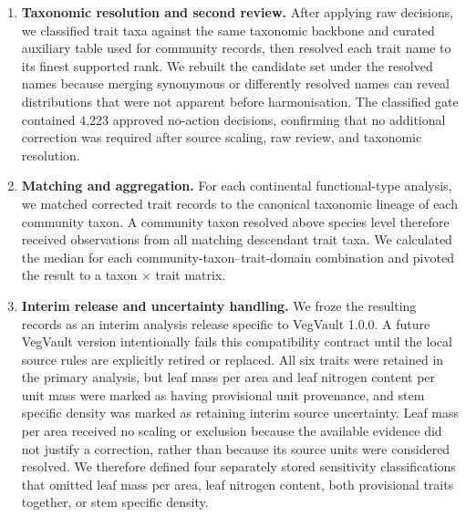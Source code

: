 \documentclass[
  12pt,
]{article}
\begin{document}
\begin{enumerate}
  gathering. AI-generated recommendations remained proposals; only
  decisions explicitly approved by the project owner with reviewer and
  date metadata entered the pipeline. The completed raw gate contained
  4,339 approved decisions: 4,262 no-action decisions, 20 exclusions,
  and 57 residual scaling rules. Before applying these decisions,
  validation rejected incomplete coverage, unmatched selectors,
  overlapping or conflicting rules, and any taxon-level scaling that
  would duplicate or contradict source-level scaling.
\item
  \textbf{Taxonomic resolution and second review.} After applying raw
  decisions, we classified trait taxa against the same taxonomic
  backbone and curated auxiliary table used for community records, then
  resolved each trait name to its finest supported rank. We rebuilt the
  candidate set under the resolved names because merging synonymous or
  differently resolved names can reveal distributions that were not
  apparent before harmonisation. The classified gate contained 4,223
  approved no-action decisions, confirming that no additional correction
  was required after source scaling, raw review, and taxonomic
  resolution.
\item
  \textbf{Matching and aggregation.} For each continental
  functional-type analysis, we matched corrected trait records to the
  canonical taxonomic lineage of each community taxon. A community taxon
  resolved above species level therefore received observations from all
  matching descendant trait taxa. We calculated the median for each
  community-taxon--trait-domain combination and pivoted the result to a
  taxon × trait matrix.
\item
  \textbf{Interim release and uncertainty handling.} We froze the
  resulting records as an interim analysis release specific to VegVault
  1.0.0. A future VegVault version intentionally fails this
  compatibility contract until the local source rules are explicitly
  retired or replaced. All six traits were retained in the primary
  analysis, but leaf mass per area and leaf nitrogen content per unit
  mass were marked as having provisional unit provenance, and stem
  specific density was marked as retaining interim source uncertainty.
  Leaf mass per area received no scaling or exclusion because the
  available evidence did not justify a correction, rather than because
  its source units were considered resolved. We therefore defined four
  separately stored sensitivity classifications that omitted leaf mass
  per area, leaf nitrogen content, both provisional traits together, or
  stem specific density.
\end{enumerate}
\end{document}
